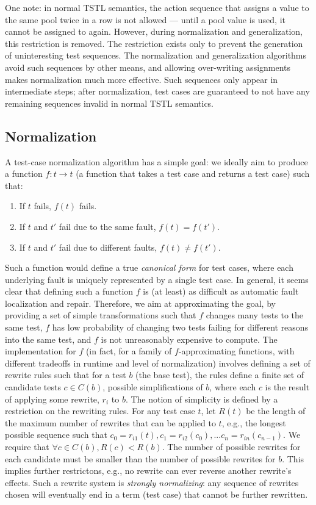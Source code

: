 One note: in normal TSTL semantics, the action sequence that assigns a
value to the same pool twice in a row is not allowed --- until a pool
value is used, it cannot be assigned to again.  However, during
normalization and generalization, this restriction is removed.  The
restriction exists only to prevent the generation of uninteresting
test sequences.  The normalization and generalization algorithms avoid
such sequences by other means, and allowing over-writing assignments
makes normalization much more effective.  Such sequences only appear
in intermediate steps; after normalization, test
cases are guaranteed to not have any remaining sequences invalid in
normal TSTL semantics.

\subsection{Normalization}

A test-case normalization algorithm has a simple goal:  we ideally aim to
produce a function $f : t \rightarrow t$ (a function that takes a test
case and returns a test case) such that:

\begin{enumerate}
\item If $t$ fails, $f(t)$ fails.
\item If $t$ and $t'$ fail due to the same fault, $f(t) = f(t')$.
\item If $t$ and $t'$ fail due to different faults, $f(t) \not=
  f(t')$.
\end{enumerate}

Such a function would define a true \emph{canonical form} for test cases, where
each underlying fault is uniquely represented by a single test case.
In general, it seems clear that defining such a function $f$ is (at least) as
difficult as automatic fault localization and repair.  Therefore, we
aim at approximating the goal, by providing a set of simple
transformations such that $f$ changes many tests to the same test, $f$
has
low probability of changing two tests failing for different reasons
into the same test, and $f$ is not unreasonably expensive to compute.
The implementation for $f$ (in fact, for a family of $f$-approximating
functions, with different tradeoffs in runtime and level of
normalization) involves defining a set of rewrite rules such that for a
test $b$ (the base test), the rules define a finite set of candidate
tests $c \in C(b)$, possible simplifications of $b$, where each $c$ is
the result of applying some rewrite, $r_i$ to $b$.  The notion of
simplicity is defined by a restriction on the rewriting rules.  For
any test case $t$, let $R(t)$ be the length of the maximum number of
rewrites that can be applied to $t$, e.g., the longest possible
sequence such that $c_0 = r_{i1}(t), c_1 = r_{i2}(c_0), ... c_n = r_{in}(c_{n-1})$. We
require that $\forall c \in C(b), R(c) < R(b)$.  The number of possible
rewrites for each candidate must be smaller than the number of
possible rewrites for $b$.  This implies further restrictons, e.g., no
rewrite can ever reverse another rewrite's effects.  Such a rewrite
system is \emph{strongly normalizing}:  any sequence of rewrites
chosen will eventually end in a term (test case) that cannot be
further rewritten.

